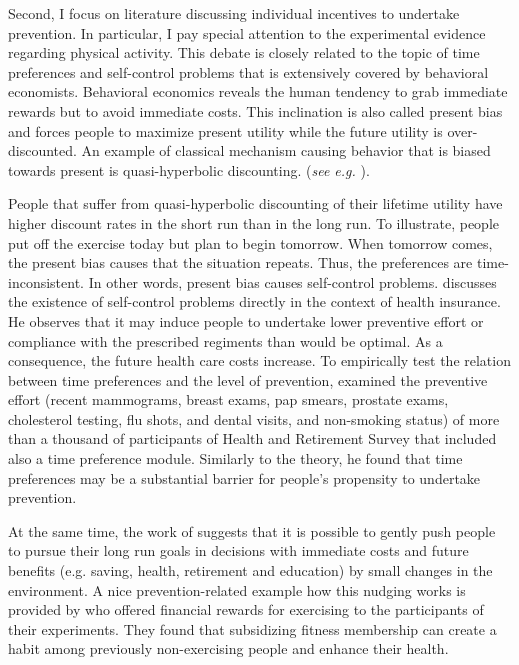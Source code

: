 \documentclass[12pt,english]{article}%
\begin{document}
Second, I focus on literature discussing individual incentives to undertake prevention. In particular, I pay special attention to the experimental evidence regarding physical activity. This debate is closely related to the topic of time preferences and self-control problems that is extensively covered by behavioral economists. Behavioral economics reveals the human tendency to grab immediate rewards but to avoid immediate costs. This inclination is also called present bias and forces people to maximize present utility while the future utility is over-discounted. An example of classical mechanism causing behavior that is biased towards present is quasi-hyperbolic discounting. (\textit{see e.g.} \citealp{odongue1999,frederick2002,laibson1997, benhabib2010}). 

People that suffer from quasi-hyperbolic discounting of their lifetime utility have higher discount rates in the short run than in the long run. To illustrate, people put off the exercise today but plan to begin tomorrow. When tomorrow comes, the present bias causes that the situation repeats. Thus, the preferences are time-inconsistent. In other words, present bias causes self-control problems. \cite{newhouse2006} discusses the existence of self-control problems directly in the context of health insurance. He observes that it may induce people to undertake lower preventive effort or compliance with the prescribed regiments than would be optimal. As a consequence, the future health care costs increase. To empirically test the relation between time preferences and the level of prevention, \cite{brandford2010} examined the preventive effort (recent mammograms, breast exams, pap smears, prostate exams, cholesterol testing, flu shots, and dental visits, and non-smoking status) of more than a thousand of participants of Health and Retirement Survey that included also a time preference module. Similarly to the theory, he found that time preferences may be a substantial barrier for people's propensity to undertake prevention. 
 
At the same time, the work of \cite{thaler2009} suggests that it is possible to gently push people to pursue their long run goals in decisions with immediate costs and future benefits (e.g. saving, health, retirement and education) by small changes in the environment. A nice prevention-related example how this nudging works is provided by \citet{charness2009} who offered financial rewards for exercising to the participants of their experiments. They found that subsidizing fitness membership can create a habit among previously non-exercising people and enhance their health. 
\end{document}

